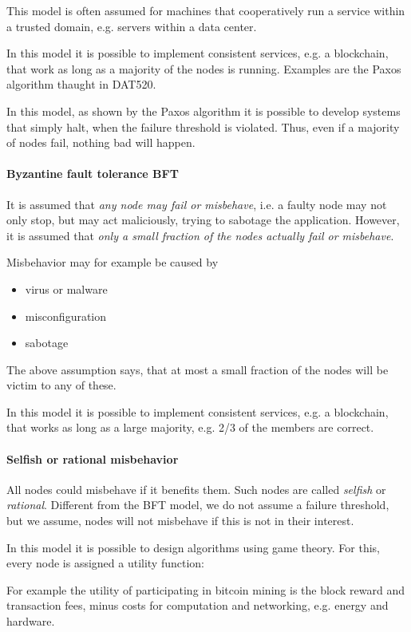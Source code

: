 This model is often assumed for machines that cooperatively run a service within a trusted domain, e.g. servers within a data center. 

In this model it is possible to implement consistent services, e.g. a blockchain, that work as long as a majority of the nodes is running. Examples are the Paxos algorithm thaught in DAT520.

In this model, as shown by the Paxos algorithm it is possible to develop systems that simply halt, when the failure threshold is violated.
Thus, even if a majority of nodes fail, nothing bad will happen.

\paragraph{Byzantine fault tolerance BFT}
It is assumed that \emph{any node may fail or misbehave}, i.e. a faulty node may not only stop, but may act maliciously, trying to sabotage the application. However, it is assumed that \emph{only a small fraction of the nodes actually fail or misbehave}.

Misbehavior may for example be caused by 
\begin{itemize}
	\item virus or malware
	\item misconfiguration
	\item sabotage
\end{itemize}
The above assumption says, that at most a small fraction of the nodes will be victim to any of these.

In this model it is possible to implement consistent services, e.g. a blockchain, that works as long as a large majority, e.g. 2/3 of the members are correct.

\paragraph{Selfish or rational misbehavior}
All nodes could misbehave if it benefits them. Such nodes are called \emph{selfish} or \emph{rational}.
Different from the BFT model, we do not assume a failure threshold, but we assume, nodes will not misbehave if this is not in their interest.

In this model it is possible to design algorithms using game theory. 
For this, every node is assigned a utility function:

For example the utility of participating in bitcoin mining is the block reward and transaction fees, minus costs for computation and networking, e.g. energy and hardware.

